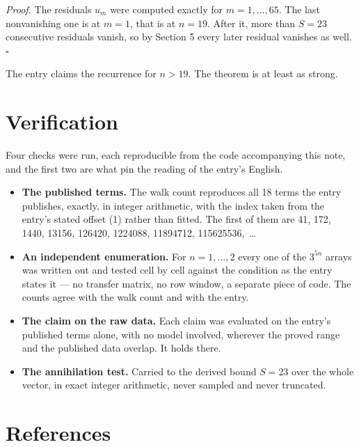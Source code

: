 \documentclass[11pt]{article}
\theoremstyle{definition}
\begin{document}
{\itshape Proof.} The residuals $u_m$ were computed exactly for $m = 1,\dots,65$. The last nonvanishing one is at $m = 1$, that is at $n = 19$. After it, more than $S = 23$ consecutive residuals vanish, so by Section 5 every later residual vanishes as well. $\square$

The entry claims the recurrence for $n > 19$. The theorem is at least as strong.

\section{Verification}

Four checks were run, each reproducible from the code accompanying this note, and the first two are what pin the reading of the entry's English.

\begin{itemize}

\item {\bfseries The published terms.} The walk count reproduces all 18 terms the entry publishes, exactly, in integer arithmetic, with the index taken from the entry's stated offset (1) rather than fitted. The first of them are 41, 172, 1440, 13156, 126420, 1224088, 11894712, 115625536,~\dots

\item {\bfseries An independent enumeration.} For $n = 1,\dots,2$ every one of the $3^{5n}$ arrays was written out and tested cell by cell against the condition as the entry states it --- no transfer matrix, no row window, a separate piece of code. The counts agree with the walk count and with the entry.

\item {\bfseries The claim on the raw data.} Each claim was evaluated on the entry's published terms alone, with no model involved, wherever the proved range and the published data overlap. It holds there.

\item {\bfseries The annihilation test.} Carried to the derived bound $S = 23$ over the whole vector, in exact integer arithmetic, never sampled and never truncated.

\end{itemize}

\section{References}
\end{document}

